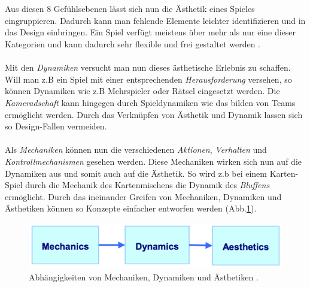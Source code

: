 \documentclass[a4paper,12pt]{scrartcl}
\begin{document}
\\\\
Aus diesen 8 Gefühlsebenen lässt sich nun die Ästhetik eines Spieles eingruppieren. Dadurch kann man fehlende Elemente leichter identifizieren und in das Design einbringen. Ein Spiel verfügt meistens über mehr als nur eine dieser Kategorien und kann dadurch sehr flexible und frei gestaltet werden \cite{Hunicke2004}.
\\\\
Mit den \textit{Dynamiken} versucht man nun dieses ästhetische Erlebnis zu schaffen. Will man z.B ein Spiel mit einer entsprechenden \textit{Herausforderung} versehen, so können Dynamiken wie z.B Mehrspieler oder Rätsel eingesetzt werden. Die \textit{Kameradschaft} kann hingegen durch Spieldynamiken wie das bilden von Teams ermöglicht werden. Durch das Verknüpfen von Ästhetik und Dynamik lassen sich so Design-Fallen vermeiden.
\\\\
Als \textit{Mechaniken} können nun die verschiedenen \textit{Aktionen}, \textit{Verhalten} und \textit{Kontrollmechanismen} gesehen werden. Diese Mechaniken wirken sich nun auf die Dynamiken aus und somit auch auf die Ästhetik. So wird z.b bei einem Karten-Spiel durch die Mechanik des Kartenmischens die Dynamik des \textit{Bluffens} ermöglicht. Durch das ineinander Greifen von Mechaniken, Dynamiken und Ästhetiken können so Konzepte einfacher entworfen werden (Abb.\ref{MDABild}). 
\begin{figure}[h!]
\begin{center}
\includegraphics[scale = 1.0]{Bilder/MDA.eps}
\caption{Abhängigkeiten von Mechaniken, Dynamiken und Ästhetiken \cite{Hunicke2004}.}
\label{MDABild}
\end{center}
\end{figure}
\end{document}

